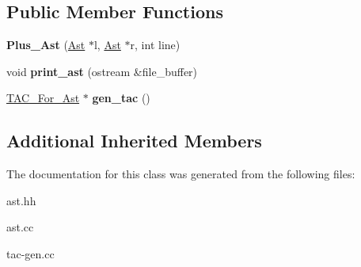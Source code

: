 \subsection*{Public Member Functions}
\begin{DoxyCompactItemize}
\item 
\mbox{\label{classPlus__Ast_a436cec2433fe29719c1802fbf634e480}} 
{\bfseries Plus\+\_\+\+Ast} (\hyperlink{classAst}{Ast} $\ast$l, \hyperlink{classAst}{Ast} $\ast$r, int line)
\item 
\mbox{\label{classPlus__Ast_a476679f8c78244e2025f838a3fbce59f}} 
void {\bfseries print\+\_\+ast} (ostream \&file\+\_\+buffer)
\item 
\mbox{\label{classPlus__Ast_ac51762b260d42caa26997ae96a9e204d}} 
\hyperlink{classTAC__For__Ast}{T\+A\+C\+\_\+\+For\+\_\+\+Ast} $\ast$ {\bfseries gen\+\_\+tac} ()
\end{DoxyCompactItemize}
\subsection*{Additional Inherited Members}


The documentation for this class was generated from the following files\+:\begin{DoxyCompactItemize}
\item 
ast.\+hh\item 
ast.\+cc\item 
tac-\/gen.\+cc\end{DoxyCompactItemize}
